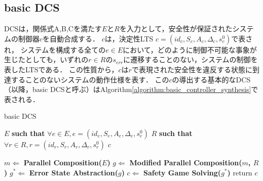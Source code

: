 \subsection{basic DCS}
\label{subsection:DCS algorithm}
DCSは，関係式A,B,Cを満たす$E$と$R$を入力として，安全性が保証されたシステムの制御器$c$を自動合成する．
$c$は，決定性LTS $c = (id_{c}, S_{c}, A_{c}, \Delta_{c}, s^0_{c})$で表され，
システムを構成する全ての$e \in E$において，どのように制御不可能な事象が生じたとしても，いずれの$r \in R$の$s_{err}$に遷移することのない，システムの制御を表したLTSである．
この性質から，$c$は$r$で表現された安全性を違反する状態に到達することのないシステムの動作仕様を表す．
この$c$の導出する基本的なDCS（以降，basic DCSと呼ぶ）\cite{paper:SynthesisOfLiveBehaviourModels}\cite{paper:SynthesisOfRun-To-CompletionControllers}\cite{paper:Concurrency}はAlgorithm\ref{algorithm:basic_controller_synthesis}で表される．

\begin{algorithm}[h]
\caption{basic DCS}
\label{algorithm:basic_controller_synthesis}
\begin{algorithmic}[1]
\renewcommand{\algorithmicrequire}{\textbf{Input:}}
\renewcommand{\algorithmicensure}{\textbf{Output:}}
\REQUIRE $E$ {\bf such that} $\forall e \in E, e = (id_{e}, S_{e}, A_{e}, \Delta_{e}, s^0_{e})$
\REQUIRE $R$ {\bf such that} $\forall r \in R, r = (id_{r}, S_{r}, A_{r}, \Delta_{r}, s^0_{r})$
\ENSURE  $c$

\STATE $m   \Leftarrow$ {\bf Parallel Composition($E$)}
\STATE $g   \Leftarrow$ {\bf Modified Parallel Composition($m$, $R$)}
\STATE $g^* \Leftarrow$ {\bf Error State Abstraction($g$)}
\STATE $c   \Leftarrow$ {\bf Safety Game Solving($g^*$)}
\STATE return $c$
\end{algorithmic}
\end{algorithm}

